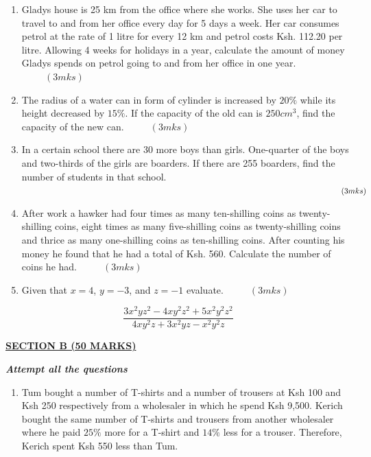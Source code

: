 \documentclass[
  a4paperpaper,
]{scrbook}
\begin{document}
\begin{tcolorbox}
\begin{enumerate}
  (b) Solve the equation in (a) above and hence find the size of the
  largest angle. \(\hspace{1cm}(2mks)\)
\item
  Gladys house is 25 km from the office where she works. She uses her
  car to travel to and from her office every day for 5 days a week. Her
  car consumes petrol at the rate of 1 litre for every 12 km and petrol
  costs Ksh. 112.20 per litre. Allowing 4 weeks for holidays in a year,
  calculate the amount of money Gladys spends on petrol going to and
  from her office in one year. \(\hspace{1cm} (3mks)\)
\item
  The radius of a water can in form of cylinder is increased by \(20\%\)
  while its height decreased by \(15\%\). If the capacity of the old can
  is \(250 cm^3\), find the capacity of the new can.
  \(\hspace{1cm} (3mks)\)
\item
  In a certain school there are 30 more boys than girls. One-quarter of
  the boys and two-thirds of the girls are boarders. If there are 255
  boarders, find the number of students in that school.
  \(\hspace{14.2cm} (3mks)\)
\item
  After work a hawker had four times as many ten-shilling coins as
  twenty-shilling coins, eight times as many five-shilling coins as
  twenty-shilling coins and thrice as many one-shilling coins as
  ten-shilling coins. After counting his money he found that he had a
  total of Ksh. 560. Calculate the number of coins he had.
  \(\hspace{1cm} (3mks)\)
\item
  Given that \(x=4\), \(y= -3\), and \(z= -1\) evaluate.
  \(\hspace{1cm} (3mks)\)
\end{enumerate}

\[\frac{3x^2yz^2-4xy^2z^2+5x^2y^2z^2}{4xy^2z+3x^2yz-x^2y^2z}\]

\ul{\textbf{SECTION B (50 MARKS)}}

\textbf{\emph{Attempt all the questions}}

\begin{enumerate}
\def\labelenumi{\arabic{enumi}.}
\setcounter{enumi}{16}
\item
  Tum bought a number of T-shirts and a number of trousers at Ksh 100
  and Ksh 250 respectively from a wholesaler in which he spend Ksh
  9,500. Kerich bought the same number of T-shirts and trousers from
  another wholesaler where he paid \(25\%\) more for a T-shirt and
  \(14\%\) less for a trouser. Therefore, Kerich spent Ksh 550 less than
  Tum.


\end{enumerate}
\end{tcolorbox}
\end{document}
